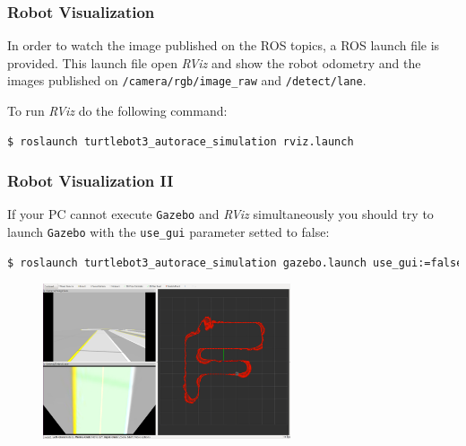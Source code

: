 \begin{frame}[fragile]
	\frametitle{Robot Visualization}
	In order to watch the image published on the ROS topics, a ROS launch file is provided. This launch file open \textit{RViz} and show the robot odometry and the images published on \texttt{/camera/rgb/image\_raw} and \texttt{/detect/lane}.
	
	To run \textit{RViz} do the following command:
\begin{lstlisting}
$ roslaunch turtlebot3_autorace_simulation rviz.launch
\end{lstlisting}
\end{frame}

\begin{frame}[fragile]
	\frametitle{Robot Visualization II}
	If your PC cannot execute \texttt{Gazebo} and \textit{RViz} simultaneously you should try to launch \texttt{Gazebo} with the \texttt{use\_gui} parameter setted to false:
\begin{lstlisting}[language=bash]
$ roslaunch turtlebot3_autorace_simulation gazebo.launch use_gui:=false
\end{lstlisting}
\begin{figure}
	\includegraphics[width=0.65\textwidth]{figures/png/rviz}
\end{figure}

\end{frame}
